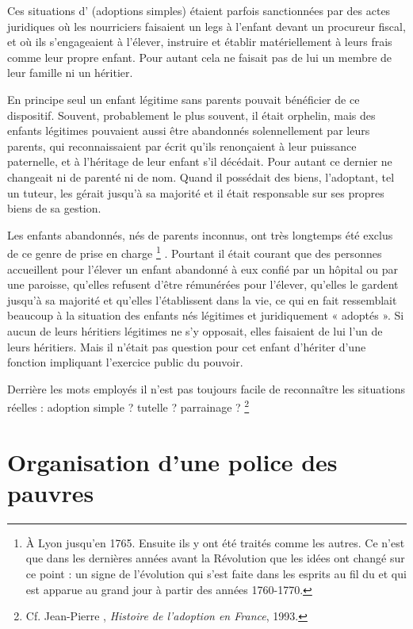  Ces situations d' (adoptions simples) étaient parfois sanctionnées par des actes juridiques où les nourriciers faisaient un legs à l'enfant devant un procureur fiscal, et où ils s'engageaient à l'élever, instruire et établir matériellement à leurs frais comme leur propre enfant. Pour autant cela ne faisait pas de lui un membre de leur famille ni un héritier. 

 En principe seul un enfant légitime sans parents pouvait bénéficier de ce dispositif. Souvent, probablement le plus souvent, il était orphelin, mais des enfants légitimes pouvaient aussi être abandonnés solennellement par leurs parents, qui reconnaissaient par écrit qu'ils renonçaient à leur puissance paternelle, et à l'héritage de leur enfant s'il décédait. Pour autant ce dernier ne changeait ni de parenté ni de nom. Quand il possédait des biens, l'adoptant, tel un tuteur, les gérait jusqu'à sa majorité et il était responsable sur ses propres biens de sa gestion. 

 Les enfants abandonnés, nés de parents inconnus, ont très longtemps été exclus de ce genre de prise en charge%
\footnote{À Lyon jusqu'en 1765. Ensuite ils y ont été traités comme les autres. Ce n'est que dans les dernières années avant la Révolution que les idées ont changé sur ce point : un signe de l'évolution qui s'est faite dans les esprits au fil du  et qui est apparue au grand jour à partir des années 1760-1770.}%
. Pourtant il était courant que des personnes accueillent pour l'élever un enfant abandonné à eux confié par un hôpital ou par une paroisse, qu'elles refusent d'être rémunérées pour l'élever, qu'elles le gardent jusqu'à sa majorité et qu'elles l'établissent dans la vie, ce qui en fait ressemblait beaucoup à la situation des enfants nés légitimes et juridiquement « adoptés ». Si aucun de leurs héritiers légitimes ne s'y opposait, elles faisaient de lui l'un de leurs héritiers. Mais il n'était pas question pour cet enfant d'hériter d'une fonction impliquant l'exercice public du pouvoir. 

 Derrière les mots employés il n'est pas toujours facile de reconnaître les situations réelles : adoption simple ? tutelle ? parrainage ?%
\footnote{Cf. Jean-Pierre , \emph{Histoire de l'adoption en France}, 1993.} 




\section{Organisation d'une police des pauvres}

